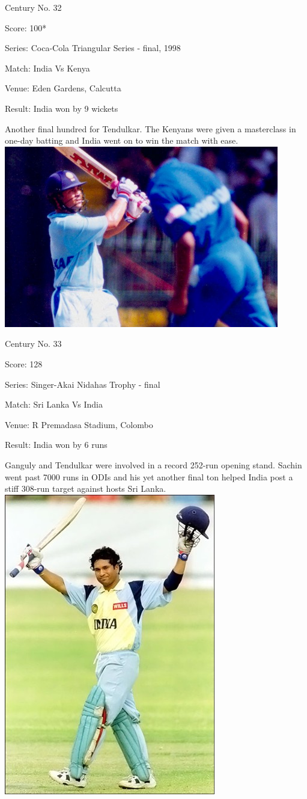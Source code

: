 \documentclass[11pt, a4paper]{article}
\begin{document}
Century No. 32

Score: 100*

Series: Coca-Cola Triangular Series - final, 1998

Match: India Vs Kenya

Venue: Eden Gardens, Calcutta

Result: India won by 9 wickets

Another final hundred for Tendulkar. The Kenyans were given a masterclass in one-day batting and India went on to win the match with ease.
\newpage
\includegraphics[width=0.9\textwidth]{pics/33.jpg}

Century No. 33

Score: 128

Series: Singer-Akai Nidahas Trophy - final

Match: Sri Lanka Vs India

Venue: R Premadasa Stadium, Colombo

Result: India won by 6 runs

Ganguly and Tendulkar were involved in a record 252-run opening stand. Sachin went past 7000 runs in ODIs and his yet another final ton helped India post a stiff 308-run target against hosts Sri Lanka.
\newpage
\includegraphics[height=0.8\textheight]{pics/34.jpg}
\end{document}
